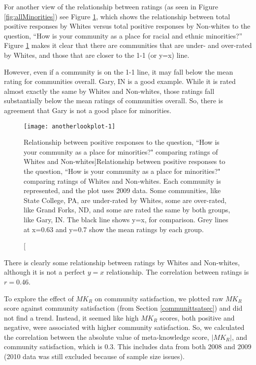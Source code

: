 \documentclass[smallextended]{svjour3}\usepackage[]{graphicx}\usepackage[]{color}
\newenvironment{knitrout}{}{} %
\begin{document}
For another view of the relationship between ratings (as seen in Figure \ref{fig:allMinorities}) see Figure \ref{fig:anotherlookplot}, which shows the relationship between  total positive responses by Whites versus total positive responses by Non-whites to the question, ``How is your community as a place for racial and ethnic minorities?'' Figure \ref{fig:anotherlookplot} makes it clear that there are communities that are under- and over-rated by Whites, and those that are closer to the 1-1 (or y=x) line. 

However, even if a community is on the 1-1 line, it may fall below the mean rating for communities overall. Gary, IN is a good example. While it is rated almost exactly the same by Whites and Non-whites, those ratings fall substantially below the mean ratings of communities overall. So, there is agreement that Gary is not a good place for minorities. 



\begin{knitrout}
\color{fgcolor}\begin{figure}

{\centering \texttt{[image: anotherlookplot-1]} 

}

\caption[Relationship between positive responses to the question, ``How is your community as a place for minorities?" comparing ratings of Whites and Non-whites]{Relationship between positive responses to the question, ``How is your community as a place for minorities?" comparing ratings of Whites and Non-whites. Each community is represented, and the plot uses 2009 data. Some communities, like State College, PA, are under-rated by Whites, some are over-rated, like Grand Forks, ND, and some are rated the same by both groups, like Gary, IN. The black line shows y=x, for comparison. Grey lines at x=0.63 and y=0.7 show the mean ratings by each group.}\label{fig:anotherlookplot}
\end{figure}


\end{knitrout}

There is clearly some relationship between ratings by Whites and Non-whites, although it is not a perfect $y=x$ relationship. The correlation between ratings is $r= $0.46.



To explore the effect of $MK_R$ on community satisfaction, we plotted raw $MK_R$ score against community satisfaction (from Section \ref{communittsatsec}) and did not find a trend. Instead, it seemed like high $MK_R$ scores, both positive and negative, were associated with higher community satisfaction. So, we calculated the correlation between the absolute value of meta-knowledge score, $|MK_R|$, and community satisfaction, which is 0.3. This includes data from both 2008 and 2009 (2010 data was still excluded because of sample size issues). 
\end{document}
